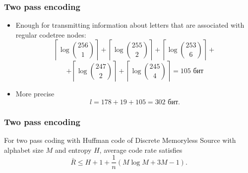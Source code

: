 \documentclass[14pt]{beamer}
\begin{document}
\begin{frame}
\frametitle{Two pass encoding}
\begin{itemize}    

    \item Enough for transmitting information about letters that are associated with regular codetree nodes:
    \[
    \left\lceil \log \binom {256} 1 \right\rceil +%
    \left\lceil \log \binom {255} 2 \right\rceil +%
    \left\lceil \log \binom {253} 6 \right\rceil +%
    \]
    \[
    +
    \left\lceil \log \binom {247} 2 \right\rceil +%
    \left\lceil \log \binom {245} 4 \right\rceil =105 \text{~бит}
    \]
    
    \item More precise 
    \begin{equation}
    \label{eq3_16} l = 178 + 19 + 105 = 302\text{~бит} .
    \end{equation}
    
\end{itemize}
\end{frame}


\begin{frame}
\frametitle{Two pass encoding}

    \begin{theorem} \label{th_two_pass}
    For two pass coding with Huffman code of Discrete Memoryless Source with alphabet size $M$ and entropy $H$, average code rate satisfies
    \begin{equation}
    \label{eq3_17} \bar {R} \le H + 1 + \frac{1}{n}\left( {M\log M + 3M - 1} \right).
    \end{equation}
    \end{theorem}

\end{frame}
\end{document}
